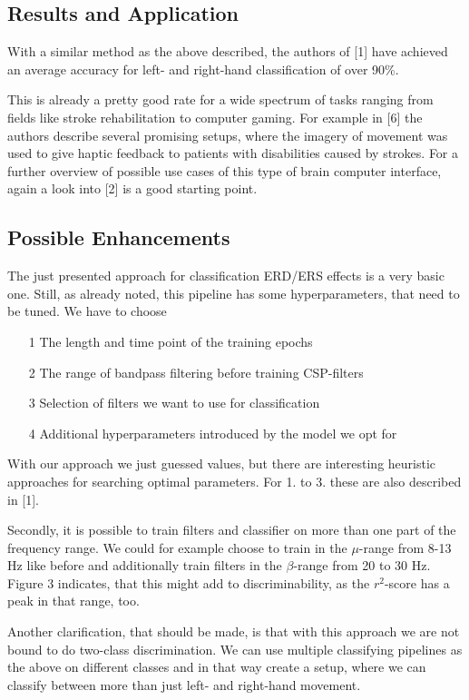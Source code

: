 \documentclass[12pt,twoside,twocolumn]{article}
\begin{document}
\subsection{Results and Application}
With a similar method as the above described, the authors of [1] have achieved an average accuracy for left- and right-hand classification of over 90\%. 

This is already a pretty good rate for a wide spectrum of tasks ranging from fields like stroke rehabilitation to computer gaming. For example in [6] the authors describe several promising setups, where the imagery of movement was used to give haptic feedback to patients with disabilities caused by strokes. For a further overview of possible use cases of this type of brain computer interface, again a look into [2] is a good starting point.

\subsection{Possible Enhancements}
The just presented approach for classification ERD/ERS effects is a very basic one. Still, as already noted, this pipeline has some hyperparameters, that need to be tuned. We have to choose
\begin{itemize}
\item[1] The length and time point of the training epochs
\item[2] The range of bandpass filtering before training CSP-filters
\item[3] Selection of filters we want to use for classification
\item[4] Additional hyperparameters introduced by the model we opt for
\end{itemize}
With our approach we just guessed values, but there are interesting heuristic approaches for searching optimal parameters. For 1. to 3. these are also described in [1].

Secondly, it is possible to train filters and classifier on more than one part of the frequency range. We could for example choose to train in the $\mu$-range from 8-13 Hz like before and additionally train filters in the $\beta$-range from 20 to 30 Hz. Figure 3 indicates, that this might add to discriminability, as the $r^2$-score has a peak in that range, too.

Another clarification, that should be made, is that with this approach we are not bound to do two-class discrimination. We can use multiple classifying pipelines as the above on different classes and in that way create a setup, where we can classify between more than just left- and right-hand movement.
\end{document}
